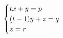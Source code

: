 \documentclass[preview]{standalone}
\begin{document}
\begin{align*}
\special{dvisvgm:raw <g id='unique000'>}\begin{cases}t x+y=p\\(t-1)y+z=q\\z=r\end{cases}\special{dvisvgm:raw </g>}
\end{align*}
\end{document}
